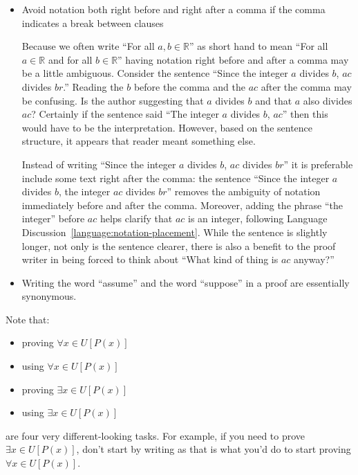 \documentclass{book}
\theoremstyle{ekimcustom}
\begin{document}
\begin{itemize}
\item Avoid notation both right before and right after a comma if the comma indicates a break between clauses

Because we often write ``For all $a,b \in \mathbb{R}$'' as short hand to mean ``For all $a \in \mathbb{R}$ and for all $b \in \mathbb{R}$'' having notation right before and after a comma may be a little ambiguous. Consider the sentence ``Since the integer $a$ divides $b$, $ac$  divides $br$.'' Reading the $b$ before the comma and the $ac$ after the comma may be confusing. Is the author suggesting that $a$ divides $b$ and that $a$ also divides $ac$? Certainly if the sentence said ``The integer $a$ divides $b$, $ac$'' then this would have to be the interpretation. However, based on the sentence structure, it appears that reader meant something else.

Instead of writing ``Since the integer $a$ divides $b$, $ac$ divides $br$'' it is preferable include some text right after the comma: the sentence ``Since the integer $a$ divides $b$, the integer $ac$ divides $br$'' removes the ambiguity of notation immediately before and after the comma. Moreover, adding the phrase ``the integer'' before $ac$ helps clarify that $ac$ is an integer, following Language Discussion~\ref{language:notation-placement}. While the sentence is slightly longer, not only is the sentence clearer, there is also a benefit to the proof writer in being forced to think about ``What kind of thing is $ac$ anyway?''

\item Writing the word ``assume'' and the word ``suppose'' in a proof are essentially synonymous.

\end{itemize}

\begin{bwarning}{}{}
Note that:
\begin{itemize}
\item proving $\forall x \in U[P(x)]$ 
\item using $\forall x \in U[P(x)]$ 
\item proving $\exists x \in U[P(x)]$ 
\item using $\exists x \in U[P(x)]$ 
\end{itemize}
are four very different-looking tasks. For example, if you need to prove $\exists x \in U[P(x)]$, don't start by writing  as that is what you'd do to start proving $\forall x \in U[P(x)]$.
\end{bwarning}
\end{document}
